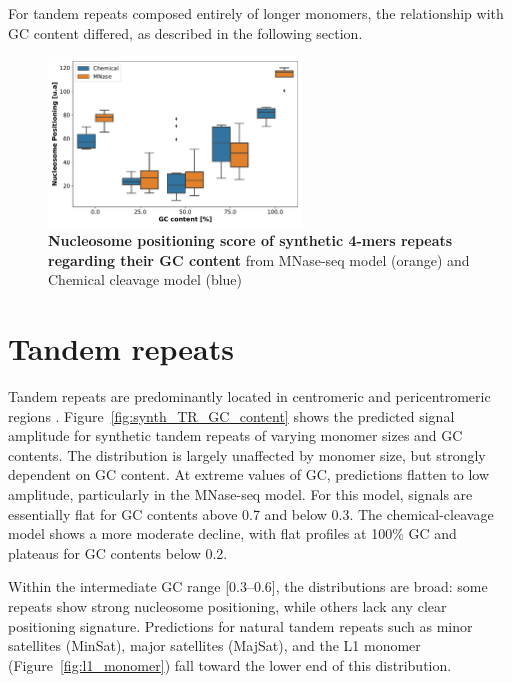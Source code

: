 \documentclass[11pt]{book}
\begin{document}
For tandem repeats composed entirely of longer monomers, the relationship with GC content differed, as described in the following section.

\begin{figure}
    \centering
    \includegraphics[width=0.6\textwidth]{Figures/synthetic_genomics_simple/GC_content_full.pdf}
    \caption{\textbf{Nucleosome positioning score of synthetic 4-mers repeats regarding their GC content} from MNase-seq model (orange) and Chemical cleavage model (blue)}
    \label{fig:synth_microsat_content}
\end{figure}


\section{Tandem repeats}

Tandem repeats are predominantly located in centromeric and pericentromeric regions \cite{komissarov_tandemly_2011}. Figure~\ref{fig:synth_TR_GC_content} shows the predicted signal amplitude for synthetic tandem repeats of varying monomer sizes and GC contents. The distribution is largely unaffected by monomer size, but strongly dependent on GC content. At extreme values of GC, predictions flatten to low amplitude, particularly in the MNase-seq model. For this model, signals are essentially flat for GC contents above 0.7 and below 0.3. The chemical-cleavage model shows a more moderate decline, with flat profiles at 100\% GC and plateaus for GC contents below 0.2.  

Within the intermediate GC range [0.3–0.6], the distributions are broad: some repeats show strong nucleosome positioning, while others lack any clear positioning signature. Predictions for natural tandem repeats such as minor satellites (MinSat), major satellites (MajSat), and the L1 monomer (Figure~\ref{fig:l1_monomer}) fall toward the lower end of this distribution.
\end{document}
